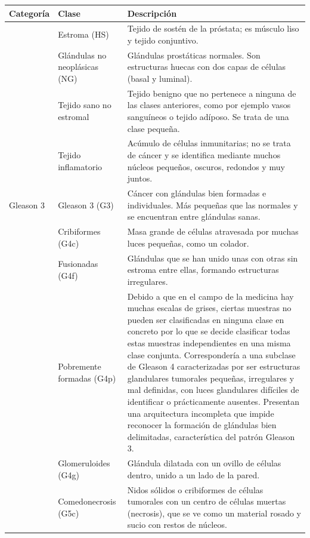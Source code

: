\begin{table}[htbp]
\centering
\footnotesize
\renewcommand{\arraystretch}{1.15}
\begin{tabularx}{\textwidth}{>{\raggedright\arraybackslash}p{2.6cm} >{\raggedright\arraybackslash}p{3.4cm} >{\raggedright\arraybackslash}X}
\toprule
\textbf{Categoría} & \textbf{Clase} & \textbf{Descripción} \\
\midrule
\multirow{4}{=}{Tejido no maligno}
 & Estroma (HS) & Tejido de sostén de la próstata; es músculo liso y tejido conjuntivo. \\
 & Glándulas no neoplásicas (NG) & Glándulas prostáticas normales. Son estructuras huecas con dos capas de células (basal y luminal). \\
 & Tejido sano no estromal & Tejido benigno que no pertenece a ninguna de las clases anteriores, como por ejemplo vasos sanguíneos o tejido adíposo. Se trata de una clase pequeña. \\
 & Tejido inflamatorio & Acúmulo de células inmunitarias; no se trata de cáncer y se identifica mediante muchos núcleos pequeños, oscuros, redondos y muy juntos. \\
\midrule
Gleason 3
 & Gleason 3 (G3) & Cáncer con glándulas bien formadas e individuales. Más pequeñas que las normales y se encuentran entre glándulas sanas. \\
\midrule
\multirow{4}{=}{Gleason 4}
 & Cribiformes (G4c) & Masa grande de células atravesada por muchas luces pequeñas, como un colador. \\
 & Fusionadas (G4f) & Glándulas que se han unido unas con otras sin estroma entre ellas, formando estructuras irregulares. \\
 & Pobremente formadas (G4p) & Debido a que en el campo de la medicina hay muchas escalas de grises, ciertas muestras no pueden ser clasificadas en ninguna clase en concreto por lo que se decide clasificar todas estas muestras independientes en una misma clase conjunta. Correspondería a una subclase de Gleason 4 caracterizadas por ser estructuras glandulares tumorales pequeñas, irregulares y mal definidas, con luces glandulares difíciles de identificar o prácticamente ausentes. Presentan una arquitectura incompleta que impide reconocer la formación de glándulas bien delimitadas, característica del patrón Gleason 3.\\
 & Glomeruloides (G4g) & Glándula dilatada con un ovillo de células dentro, unido a un lado de la pared. \\
\midrule
\multirow{2}{=}{Gleason 5}
 & Comedonecrosis (G5c) & Nidos sólidos o cribiformes de células tumorales con un centro de células muertas (necrosis), que se ve como un material rosado y sucio con restos de núcleos. \\

\end{tabularx}
\end{table}
